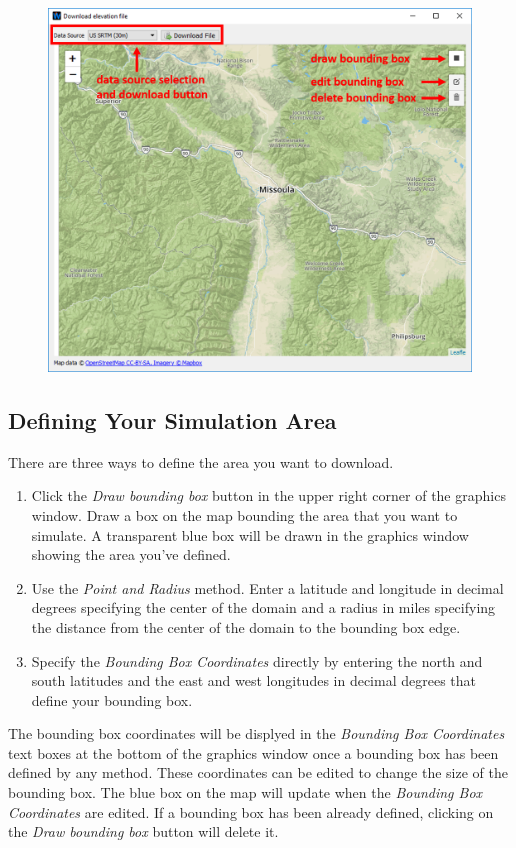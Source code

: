 \documentclass[12pt]{article}
\begin{document}
\begin{figure}[H]
	\centering
	\label{}
	\includegraphics[scale=0.75]{dem_download_1}
\end{figure}

\subsection*{Defining Your Simulation Area}

There are three ways to define the area you want to download. 
\begin{enumerate}
\item Click the \textit{Draw bounding box} button in the upper right corner of the graphics window. Draw a box on the map bounding the area that you want to simulate. A transparent blue box will be drawn in the graphics window showing the area you've defined. 
\item Use the \textit{Point and Radius} method. Enter a latitude and longitude in decimal degrees specifying the center of the domain and a radius in miles specifying the distance from the center of the domain to the bounding box edge.
\item Specify the \textit{Bounding Box Coordinates} directly by entering the north and south latitudes and the east and west longitudes in decimal degrees that define your bounding box.
\end{enumerate}
The bounding box coordinates will be displyed in the \textit{Bounding Box Coordinates} text boxes at the bottom of the graphics window once a bounding box has been defined by any method. These coordinates can be edited to change the size of the bounding box. The blue box on the map will update when the \textit{Bounding Box Coordinates} are edited. If a bounding box has been already defined, clicking on the \textit{Draw bounding box} button will delete it.
\end{document}

